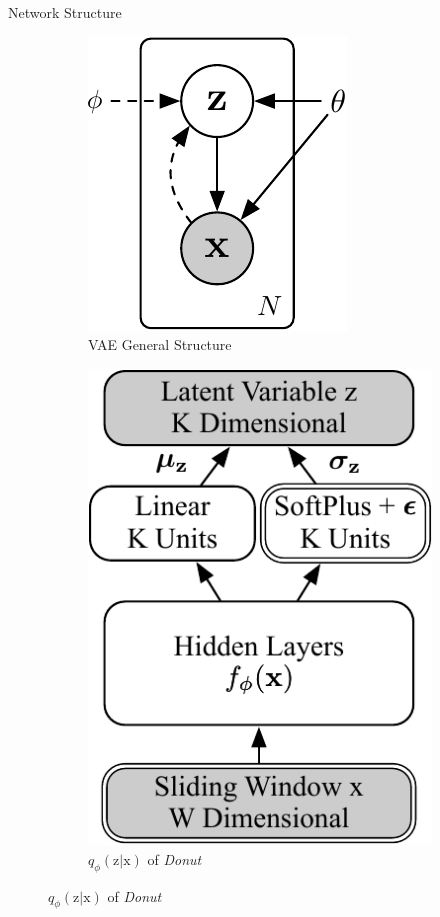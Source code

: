 \documentclass[usenames,dvipsnames]{beamer}
\newcommand{\DONUT}{\textit{Donut}}
\newcommand{\vv}[1]{\bm{\mathrm{{#1}}}}
\begin{document}
\begin{frame}{Network Structure}
  \begin{figure}
    \begin{subfigure}[t]{.33\columnwidth}
      \centering
      \includegraphics[height=.35\textheight]{variational-auto-encoder}
      \caption{VAE General Structure}
    \end{subfigure}\hfill
    \begin{subfigure}[t]{.33\columnwidth}
      \centering
      \includegraphics[height=.45\textheight]{variational-net}
      \caption{$q_{\phi}(\vv{z}|\vv{x})$ of \DONUT{}}
    \end{subfigure}\hfill

\end{figure}
\end{frame}
\end{document}
